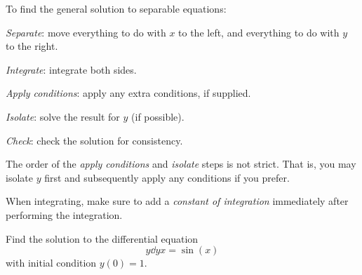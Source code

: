 \documentclass{book}
\begin{document}
To find the general solution to separable equations:
\begin{enumerate*}
\item \emph{Separate}: move everything to do with $x$ to the left, and
  everything to do with $y$ to the right.
\item \emph{Integrate}: integrate both sides.
\item \emph{Apply conditions}: apply any extra conditions, if
  supplied.
\item \emph{Isolate}: solve the result for $y$ (if possible).
\item \emph{Check}: check the solution for consistency.
\end{enumerate*}

The order of the \emph{apply conditions} and \emph{isolate} steps is
not strict.  That is, you may isolate $y$ first and subsequently apply
any conditions if you prefer.

\begin{heads}
  When integrating, make sure to add a \emph{constant of integration}
  immediately after performing the integration.
\end{heads}

\newpage
\begin{easyexample}
  Find the solution to the differential equation
  \begin{dmath}
    \label{eq:ex:separable}
    y \dd{y}{x} = \sin(x)
  \end{dmath}
  with initial condition $y(0) = 1$.
\end{easyexample}
\end{document}
